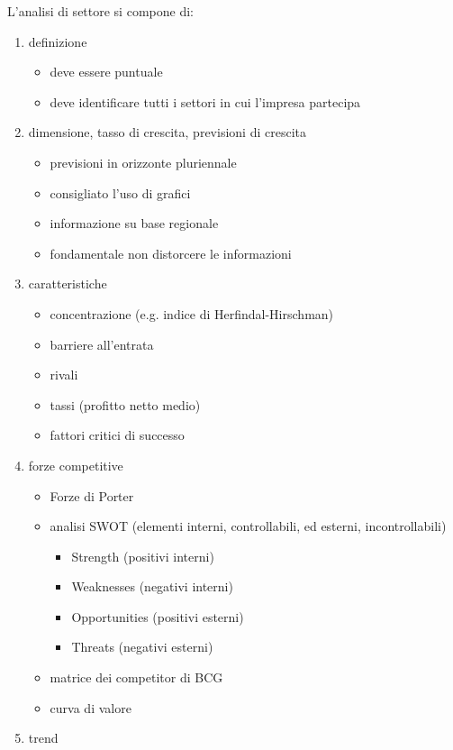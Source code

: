 \documentclass[answers, a4paper, 11pt]{exam}
\begin{document}
L'analisi di settore si compone di:
\begin{enumerate}
    \item definizione
    \begin{itemize}
        \item deve essere puntuale
        \item deve identificare tutti i settori in cui l'impresa partecipa
    \end{itemize}
    \item dimensione, tasso di crescita, previsioni di crescita
    \begin{itemize}
        \item previsioni in orizzonte pluriennale
        \item consigliato l'uso di grafici
        \item informazione su base regionale
        \item fondamentale non distorcere le informazioni
    \end{itemize}
    \item caratteristiche
    \begin{itemize}
        \item concentrazione (e.g. indice di Herfindal-Hirschman)
        \item barriere all'entrata
        \item rivali
        \item tassi (profitto netto medio)
        \item fattori critici di successo
    \end{itemize}
    \item forze competitive
    \begin{itemize}
        \item Forze di Porter
        \item analisi SWOT (elementi interni, controllabili, ed esterni, incontrollabili)
        \begin{itemize}
            \item Strength (positivi interni)
            \item Weaknesses (negativi interni)
            \item Opportunities (positivi esterni)
            \item Threats (negativi esterni)
        \end{itemize}
        \item matrice dei competitor di BCG
        \item curva di valore
    \end{itemize}
    \item trend
\end{enumerate}
\end{document}
